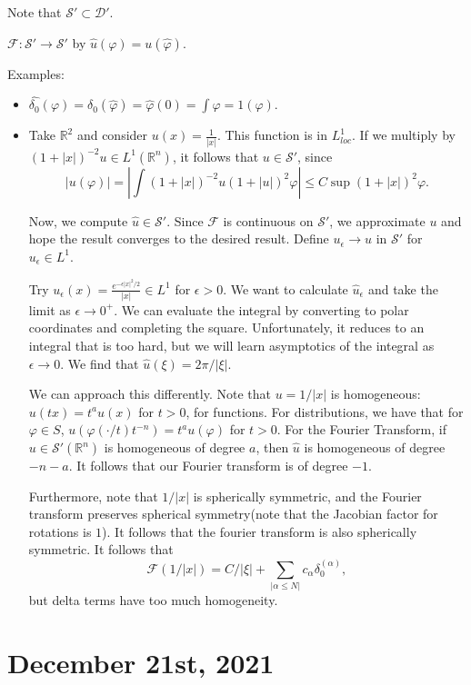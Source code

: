 \documentclass[12pt]{scrartcl}
\newcommand{\R}{\mathbb{R}}
\renewcommand{\hat}{\widehat}
\newcommand{\<}{\langle}
\renewcommand{\>}{\rangle}
\let \phi \varphi
\let \mc \mathcal
\begin{document}
Note that $\mc S' \subset \mc D'$.  

\begin{definition} $\mc F: \mc S' \to \mc S'$ by $\hat{u}(\phi) = u(\hat{\phi})$.
\end{definition}
Examples:
\begin{itemize}
\item $\hat{\delta_0}(\phi) = \delta_0(\hat{\phi}) = \hat{\phi}(0) = \int \phi = 1(\phi).$
\item Take $\R^2$ and consider $u(x) = \frac{1}{|x|}$.  This function is in $L_{loc}^1$.  If we multiply by $(1 + |x|)^{-2} u \in L^1(\R^n)$, it follows that $u \in \mc S'$, since 
$$|u(\phi)| = \left |\int (1 + |x|)^{-2} u (1 + |u|)^2 \phi\right | \le C \sup (1 + |x|)^2 \phi.$$

Now, we compute $\hat{u} \in \mc S'$.  Since $\mc F$ is continuous on $\mc S'$, we approximate $u$ and hope the result converges to the desired result.  Define $u_\epsilon \to u$ in $\mc S'$ for $u_\epsilon \in L^1$.  

Try $u_\epsilon(x) = \frac{e^{-\epsilon |x|^2/2}}{|x|} \in L^1$ for $\epsilon > 0$.  We want to calculate $\hat{u}_\epsilon$ and take the limit as $\epsilon \to 0^+$.   We can evaluate the integral by converting to polar coordinates and completing the square.  Unfortunately, it reduces to an integral that is too hard, but we will learn asymptotics of the integral as $\epsilon \to 0$.  We find that $\hat{u}(\xi) = 2\pi/|\xi|$.

We can approach this differently.  Note that $u = 1/|x|$ is homogeneous: $u(tx) = t^a u(x)$ for $t > 0$, for functions.  For distributions, we have that for $\phi \in S$, $u(\phi(\cdot / t) t^{-n}) = t^a u(\phi)$ for $t > 0$.  For the Fourier Transform, if $u \in \mc S'(\R^n)$ is homogeneous of degree $a$, then $\hat{u}$ is homogeneous of degree $-n-a$.  It follows that our Fourier transform is of degree $-1$.  

Furthermore, note that $1/|x|$ is spherically symmetric, and the Fourier transform preserves spherical symmetry(note that the Jacobian factor for rotations is $1$).  It follows that the fourier transform is also spherically symmetric.  It follows that 
$$\mc F(1/|x|) = C/|\xi| + \sum_{|\alpha \le N| }c_\alpha \delta_0^{(\alpha)},$$
but delta terms have too much homogeneity.  
\end{itemize}

\pagebreak
\section{December 21st, 2021}
\end{document}
